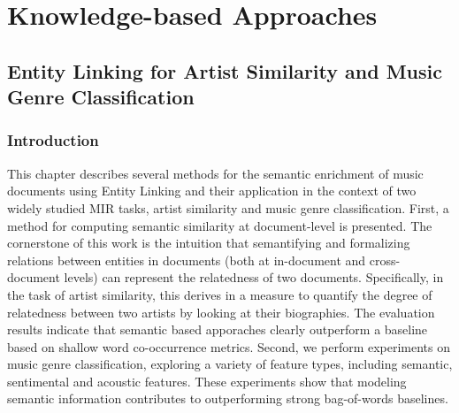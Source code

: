 
\part{Knowledge-based Approaches}
\label{part:knowledge-based}

\chapter{Entity Linking for Artist Similarity and Music Genre Classification}
\label{sec}

\section{Introduction}\label{sec:similarity:introduction} %

This chapter describes several methods for the semantic enrichment of music documents using Entity Linking and their application in the context of two widely studied MIR tasks, artist similarity and music genre classification. 
First, a method for computing semantic similarity at document-level is presented. The cornerstone of this work is the intuition that semantifying and formalizing relations between entities in documents (both at in-document and cross-document levels) can represent the relatedness of two documents. Specifically, in the task of artist similarity, this derives in a measure to quantify the degree of relatedness between two artists by looking at their biographies. The evaluation results indicate that semantic based apporaches clearly outperform a baseline based on shallow word co-occurrence metrics.
Second, we perform experiments on music genre classification, exploring a variety of feature types, including semantic, sentimental and acoustic features. These experiments show that modeling semantic information contributes to outperforming strong bag-of-words baselines. 

